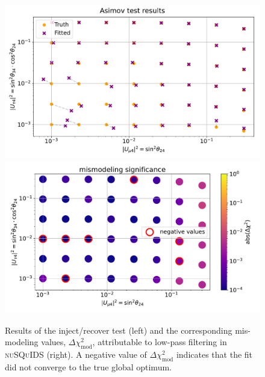 \begin{figure}
    \centering
    \includegraphics[width=0.49\linewidth]{figures/measurement/sterile_analysis/asimov_test/asimov_vs_v12_fit_err.pdf}
    \includegraphics[width=0.49\linewidth]{figures/measurement/sterile_analysis/asimov_test/asimov_vs_v12_mismod.pdf}
    \caption{Results of the inject/recover test (left) and the corresponding mis-modeling values, $\Delta \chi^2_{\mathrm{mod}}$, attributable to low-pass filtering in \textsc{nuSQuIDS} (right). A negative value of $\Delta \chi^2_\mathrm{mod}$ indicates that the fit did not converge to the true global optimum.}
    \label{fig:asimov-test-sterile-ana}
\end{figure}

